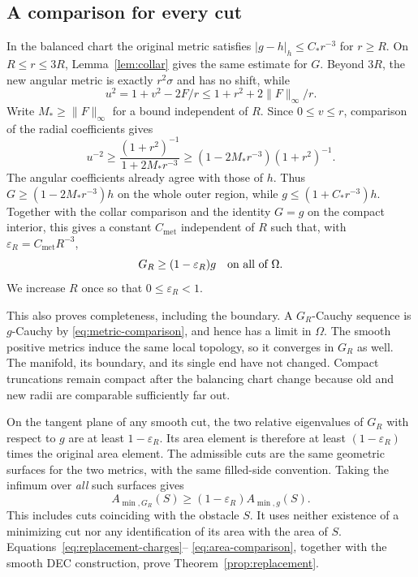 \subsection{A comparison for every cut}
In the balanced chart the original metric satisfies
$|g-h|_h\leq C_* r^{-3}$ for $r\geq R$. On $R\leq r\leq3R$,
Lemma~\ref{lem:collar} gives the same estimate for $G$. Beyond $3R$,
the new angular metric is exactly $r^2\sigma$ and has no shift, while
\[
 u^2=1+v^2-2F/r\leq1+r^2+2\|F\|_\infty/r.
\]
Write $M_*\geq\|F\|_\infty$ for a bound independent of $R$.
Since $0\leq v\leq r$, comparison of the radial coefficients gives
\[
 u^{-2}\geq\frac{(1+r^2)^{-1}}{1+2M_*r^{-3}}
       \geq(1-2M_*r^{-3})(1+r^2)^{-1}.
\]
The angular coefficients already agree with those of $h$. Thus
$G\geq(1-2M_*r^{-3})h$ on the whole outer region, while
$g\leq(1+C_*r^{-3})h$. Together with the collar comparison and
the identity $G=g$ on the compact interior, this gives a constant
$C_{\mathrm{met}}$ independent of $R$ such that, with
$\varepsilon_R=C_{\mathrm{met}}R^{-3}$,
\begin{equation}\label{eq:metric-comparison}
 G_R\geq(1-\varepsilon_R)g\quad\hbox{on all of }\Omega.
\end{equation}
We increase $R$ once so that $0\leq\varepsilon_R<1$.

This also proves completeness, including the boundary. A $G_R$-Cauchy
sequence is $g$-Cauchy by \eqref{eq:metric-comparison}, and hence has a
limit in $\Omega$. The smooth positive metrics induce the same local
topology, so it converges in $G_R$ as well. The manifold, its boundary,
and its single end have not changed. Compact truncations remain compact
after the balancing chart change because old and new radii are
comparable sufficiently far out.

On the tangent plane of any smooth cut, the two relative eigenvalues
of $G_R$ with respect to $g$ are at least $1-\varepsilon_R$. Its area
element is therefore at least $(1-\varepsilon_R)$ times the original
area element. The admissible cuts are the same geometric surfaces for
the two metrics, with the same filled-side convention. Taking the
infimum over \emph{all} such surfaces gives
\begin{equation}\label{eq:area-comparison}
 A_{\min,G_R}(S)\geq(1-\varepsilon_R)A_{\min,g}(S).
\end{equation}
This includes cuts coinciding with the obstacle $S$. It uses neither
existence of a minimizing cut nor any identification of its area with
the area of $S$. Equations~\eqref{eq:replacement-charges}--
\eqref{eq:area-comparison}, together with the smooth DEC construction,
prove Theorem~\ref{prop:replacement}.

